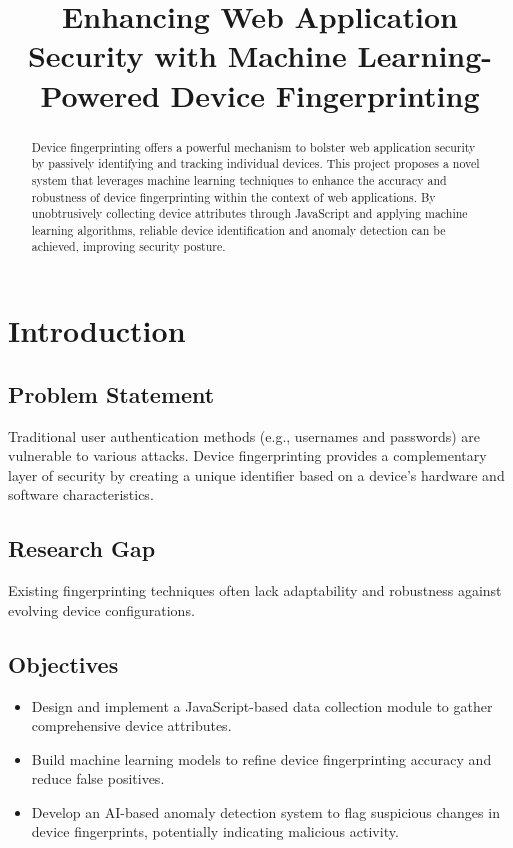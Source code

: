 \documentclass{article}
\title{Enhancing Web Application Security with Machine Learning-Powered Device Fingerprinting}
\author{}
\date{}
\begin{document}
\maketitle

\begin{abstract}
Device fingerprinting offers a powerful mechanism to bolster web application security by passively identifying and tracking individual devices. This project proposes a novel system that leverages machine learning techniques to enhance the accuracy and robustness of device fingerprinting within the context of web applications. By unobtrusively collecting device attributes through JavaScript and applying machine learning algorithms, reliable device identification and anomaly detection can be achieved, improving security posture.
\end{abstract}

\section{Introduction}

\subsection{Problem Statement}
Traditional user authentication methods (e.g., usernames and passwords) are vulnerable to various attacks. Device fingerprinting provides a complementary layer of security by creating a unique identifier based on a device's hardware and software characteristics.

\subsection{Research Gap}
Existing fingerprinting techniques often lack adaptability and robustness against evolving device configurations.

\subsection{Objectives}
\begin{itemize}
    \item Design and implement a JavaScript-based data collection module to gather comprehensive device attributes.
    \item Build machine learning models to refine device fingerprinting accuracy and reduce false positives.
    \item Develop an AI-based anomaly detection system to flag suspicious changes in device fingerprints, potentially indicating malicious activity.
\end{itemize}
\end{document}

